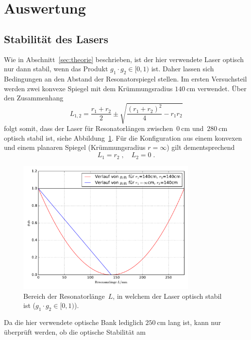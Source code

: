 \section{Auswertung}
\label{sec:auswertung}

%
\subsection{Stabilität des Lasers}
%
Wie in Abschnitt~\ref{sec:theorie} beschrieben, ist der hier verwendete Laser optisch nur dann stabil, wenn das Produkt $g_1\cdot g_2\in[0,1)$ ist. Daher lassen sich Bedingungen an den Abstand der Resonatorspiegel stellen. Im ersten Versuchsteil werden zwei konvexe Spiegel mit dem Krümmungsradius $\SI{140}{\centi\meter}$ verwendet. Über den Zusammenhang
%
\begin{equation}
  L_{1,2}=\frac{r_1+r_2}{2}\pm\sqrt{\frac{(r_1+r_2)^2}{4}-r_1r_2}
\end{equation}
%
folgt somit, dass der Laser für Resonatorlängen zwischen~$\SI{0}{\centi\meter}$ und~$\SI{280}{\centi\meter}$ optisch stabil ist, siehe
Abbildung~\ref{fig:opt_stab}. Für die Konfiguration aus einem konvexen und einem planaren Spiegel (Krümmungsradius $r=\infty$) gilt dementsprechend
%
\begin{equation}
  L_1=r_2\; , \quad L_2=0 \; .
\end{equation}
%
\begin{figure}[h]
  \centering
  \includegraphics[width=0.8\textwidth]{auswertung/plot_laser_140_140.pdf}
  \caption{Bereich der Resonatorlänge~$L$, in welchem der Laser optisch stabil ist ($g_1\cdot g_2\in[0,1)$).}
  \label{fig:opt_stab}
\end{figure}
%
Da die hier verwendete optische Bank lediglich $\SI{250}{\centi\meter}$ lang ist, kann nur überprüft werden, ob die optische Stabilität am
